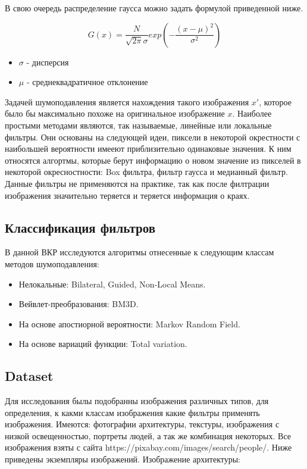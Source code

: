 В свою очередь распределение гаусса можно задать формулой приведенной ниже.

\begin{equation}\label{eGaussNoise}
	G(x)=\frac{N}{\sqrt{2\pi}\sigma}exp(-\frac{(x-\mu)^2}{\sigma^2})	
\end{equation}
\begin{itemize}
	\item $\sigma$ - дисперсия 
	\item $\mu$ - среднеквадратичное отклонение
\end{itemize}

Задачей шумоподавления является нахождения такого изображения $x'$, которое было бы максимально похоже на оригинальное изображение $x$. 
Наиболее простыми методами являются, так называемые, линейные или локальные фильтры. Они основаны на следующей идеи, пиксели в некоторой окрестности с наибольшей вероятности имееют приблизительно одинаковые значения. К ним относятся алгортмы, которые берут информацию о новом значение из пикселей в некоторой окресностности: Box фильтра, фильтр гаусса и медианный фильтр. Данные фильтры не применяются на практике, так как после филтрации изображения значительно теряется и теряется информация о краях.

\subsection{Классификация фильтров}
В данной ВКР исследуются алгоритмы отнесенные к следующим классам методов шумоподавления:
\begin{itemize}
	\item Нелокальные: Bilateral, Guided, Non-Local Means.
	\item Вейвлет-преобразования: BM3D.
	\item На основе апостиорной вероятности: Markov Random Field.
	\item На основе вариаций функции: Total variation.
\end{itemize}

\subsection{Dataset}
Для исследования былы подобранны изображения различных типов, для определения, к какми классам изображения
какие фильтры применять изображения. Имеются: фотографии архитектуры, текстуры, изображения с низкой освещенностью, портреты людей, а так же комбинация некоторых. Все изображения взяты с сайта https://pixabay.com/images/search/people/. Ниже приведены экземпляры изображений.
Изображение архитектуры:

